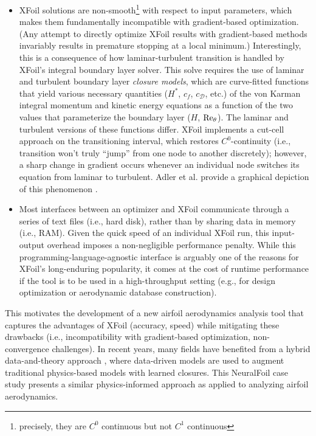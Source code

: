 \begin{itemize}
    \item XFoil solutions are non-smooth\footnote{precisely, they are $C^0$ continuous but not $C^1$ continuous} with respect to input parameters, which makes them fundamentally incompatible with gradient-based optimization. (Any attempt to directly optimize XFoil results with gradient-based methods invariably results in premature stopping at a local minimum.) Interestingly, this is a consequence of how laminar-turbulent transition is handled by XFoil's integral boundary layer solver. This solve requires the use of laminar and turbulent boundary layer \emph{closure models}, which are curve-fitted functions that yield various necessary quantities ($H^*$, $c_f$, $c_\mathcal{D}$, etc.) of the von Karman integral momentum and kinetic energy equations as a function of the two values that parameterize the boundary layer ($H$, $\rm Re_\theta$). The laminar and turbulent versions of these functions differ. XFoil implements a cut-cell approach on the transitioning interval, which restores $C^0$-continuity (i.e., transition won't truly ``jump'' from one node to another discretely); however, a sharp change in gradient occurs whenever an individual node switches its equation from laminar to turbulent. Adler et al. provide a graphical depiction of this phenomenon \cite{adler_cfd_2022}.
    \item Most interfaces between an optimizer and XFoil communicate through a series of text files (i.e., hard disk), rather than by sharing data in memory (i.e., RAM). Given the quick speed of an individual XFoil run, this input-output overhead imposes a non-negligible performance penalty. While this programming-language-agnostic interface is arguably one of the reasons for XFoil's long-enduring popularity, it comes at the cost of runtime performance if the tool is to be used in a high-throughput setting (e.g., for design optimization or aerodynamic database construction).
\end{itemize}

This motivates the development of a new airfoil aerodynamics analysis tool that captures the advantages of XFoil (accuracy, speed) while mitigating these drawbacks (i.e., incompatibility with gradient-based optimization, non-convergence challenges). In recent years, many fields have benefited from a hybrid data-and-theory approach \cite{brunton_data_2017}, where data-driven models are used to augment traditional physics-based models with learned closures. This NeuralFoil case study presents a similar physics-informed approach as applied to analyzing airfoil aerodynamics.


